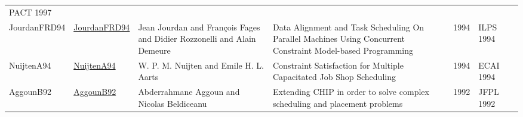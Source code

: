 {\begin{longtable}{llp{5cm}p{10cm}rp{3cm}l}
PACT 1997 & \cite{PapeB97}\\JourdanFRD94 & \href{}{JourdanFRD94} & Jean Jourdan and Fran{\c{c}}ois Fages and Didier Rozzonelli and Alain Demeure & Data Alignment and Task Scheduling On Parallel Machines Using Concurrent Constraint Model-based Programming & 1994 & ILPS 1994 & \cite{JourdanFRD94}\\NuijtenA94 & \href{}{NuijtenA94} & W. P. M. Nuijten and Emile H. L. Aarts & Constraint Satisfaction for Multiple Capacitated Job Shop Scheduling & 1994 & ECAI 1994 & \cite{NuijtenA94}\\AggounB92 & \href{}{AggounB92} & Abderrahmane Aggoun and Nicolas Beldiceanu & Extending {CHIP} in order to solve complex scheduling and placement problems & 1992 & JFPL 1992 & \cite{AggounB92}\\\end{longtable}
}

